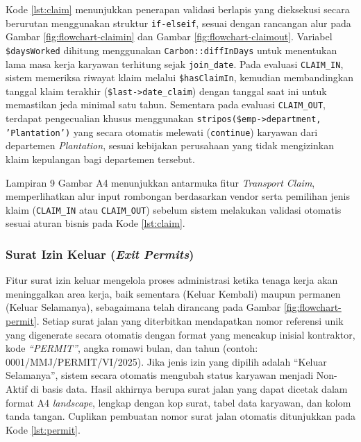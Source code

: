 Kode \ref{lst:claim} menunjukkan penerapan validasi berlapis yang dieksekusi secara berurutan menggunakan struktur \texttt{if-elseif}, sesuai dengan rancangan alur pada Gambar \ref{fig:flowchart-claimin} dan Gambar \ref{fig:flowchart-claimout}. Variabel \texttt{\$daysWorked} dihitung menggunakan \texttt{Carbon::diffInDays} untuk menentukan lama masa kerja karyawan terhitung sejak \texttt{join\_date}. Pada evaluasi \texttt{CLAIM\_IN}, sistem memeriksa riwayat klaim melalui \texttt{\$hasClaimIn}, kemudian membandingkan tanggal klaim terakhir (\texttt{\$last->date\_claim}) dengan tanggal saat ini untuk memastikan jeda minimal satu tahun. Sementara pada evaluasi \texttt{CLAIM\_OUT}, terdapat pengecualian khusus menggunakan \texttt{stripos(\$emp->department, 'Plantation')} yang secara otomatis melewati (\texttt{continue}) karyawan dari departemen \textit{Plantation}, sesuai kebijakan perusahaan yang tidak mengizinkan klaim kepulangan bagi departemen tersebut.

Lampiran 9 Gambar A4 menunjukkan antarmuka fitur \textit{Transport Claim}, memperlihatkan alur input rombongan berdasarkan vendor serta pemilihan jenis klaim (\texttt{CLAIM\_IN} atau \texttt{CLAIM\_OUT}) sebelum sistem melakukan validasi otomatis sesuai aturan bisnis pada Kode \ref{lst:claim}.

\subsubsection{Surat Izin Keluar (\textit{Exit Permits})}

Fitur surat izin keluar mengelola proses administrasi ketika tenaga kerja akan meninggalkan area kerja, baik sementara (Keluar Kembali) maupun permanen (Keluar Selamanya), sebagaimana telah dirancang pada Gambar \ref{fig:flowchart-permit}. Setiap surat jalan yang diterbitkan mendapatkan nomor referensi unik yang digenerate secara otomatis dengan format yang mencakup inisial kontraktor, kode \textit{``PERMIT''}, angka romawi bulan, dan tahun (contoh: 0001/MMJ/PERMIT/VI/2025). Jika jenis izin yang dipilih adalah ``Keluar Selamanya'', sistem secara otomatis mengubah status karyawan menjadi Non-Aktif di basis data. Hasil akhirnya berupa surat jalan yang dapat dicetak dalam format A4 \textit{landscape}, lengkap dengan kop surat, tabel data karyawan, dan kolom tanda tangan. Cuplikan pembuatan nomor surat jalan otomatis ditunjukkan pada Kode \ref{lst:permit}.

